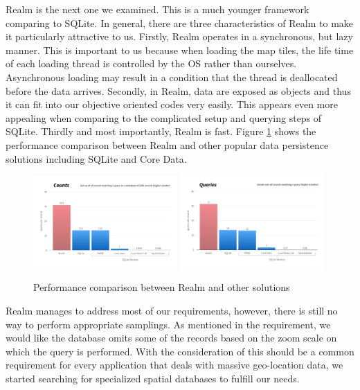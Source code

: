 \documentclass[12pt,a4paper]{article}
\begin{document}
            Realm is the next one we examined. This is a much younger framework comparing to SQLite. In general, there are three characteristics of Realm to make it particularly attractive to us. Firstly, Realm operates in a synchronous, but lazy manner. This is important to us because when loading the map tiles, the life time of each loading thread is controlled by the OS rather than ourselves. Asynchronous loading may result in a condition that the thread is deallocated before the data arrives. Secondly, in Realm, data are exposed as objects and thus it can fit into our objective oriented codes very easily. This appears even more appealing when comparing to the complicated setup and querying steps of SQLite. Thirdly and most importantly, Realm is fast. Figure \ref{fig:database-performance} shows the performance comparison between Realm and other popular data persistence solutions including SQLite and Core Data. \citet{DatabasePerformanceFigure}
            
            
            \begin{figure}
                \includegraphics[width=0.49\textwidth]{4-2-1-a}
                \includegraphics[width=0.49\textwidth]{4-2-1-b}
                \centering
                \caption{Performance comparison between Realm and other solutions}
                \label{fig:database-performance}
            \end{figure}
            
            Realm manages to address most of our requirements, however, there is still no way to perform appropriate samplings. As mentioned in the requirement, we would like the database omits some of the records based on the zoom scale on which the query is performed. With the consideration of this should be a common requirement for every application that deals with massive geo-location data, we started searching for specialized spatial databases to fulfill our needs.
            
\end{document}
